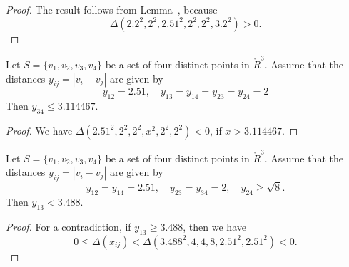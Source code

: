 
\begin{proof}
The result follows from Lemma~,
because
    $$
    \Delta(2.2^2,2^2,2.51^2,2^2,2^2,3.2^2) > 0.
    $$
\end{proof}
\newpage


\begin{lemma}
Let $S=\{v_1,v_2,v_3,v_4\}$ be a set of four distinct points in $\ring{R}^3$.  Assume that
the distances $y_{ij}=|v_i-v_j|$ are given by
	$$
	y_{12}=2.51, \quad y_{13} = y_{14}=
	y_{23}=y_{24}=2
	$$
Then $y_{34}\le 3.114467$.
\end{lemma}


\begin{proof}
We have
    $\Delta(2.51^2,2^2,2^2,x^2,2^2,2^2)<0$, if $x> 3.114467$.
\end{proof}
\newpage


\begin{lemma}
Let $S=\{v_1,v_2,v_3,v_4\}$ be a set of four distinct points in $\ring{R}^3$.  Assume that
the distances $y_{ij}=|v_i-v_j|$ are given by
	$$
        y_{12}=y_{14}=2.51,\quad y_{23}=y_{34}=2,\quad y_{24}\ge\sqrt8.
	$$
Then $y_{13}< 3.488$.
\end{lemma}



\begin{proof}
For a contradiction, if $y_{13}\ge 3.488$, then
we have
    $$0\le \Delta(x_{ij}) < \Delta(3.488^2,4,4,8,2.51^2,2.51^2)<0.$$
\end{proof}
\newpage


%
%

